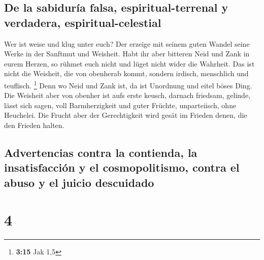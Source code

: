 \hypertarget{de-la-sabiduruxeda-falsa-espiritual-terrenal-y-verdadera-espiritual-celestial}{%
\subsection{De la sabiduría falsa, espiritual-terrenal y verdadera,
espiritual-celestial}\label{de-la-sabiduruxeda-falsa-espiritual-terrenal-y-verdadera-espiritual-celestial}}

 Wer ist weise und klug unter euch? Der erzeige mit
seinem guten Wandel seine Werke in der Sanftmut und Weisheit.
 Habt ihr aber bitteren Neid und Zank in eurem Herzen, so
rühmet euch nicht und lüget nicht wider die Wahrheit. 
Das ist nicht die Weisheit, die von obenherab kommt, sondern irdisch,
menschlich und teuflisch. \footnote{\textbf{3:15} Jak 1,5}
 Denn wo Neid und Zank ist, da ist Unordnung und eitel
böses Ding.  Die Weisheit aber von obenher ist aufs erste
keusch, darnach friedsam, gelinde, lässt sich sagen, voll Barmherzigkeit
und guter Früchte, unparteiisch, ohne Heuchelei.  Die
Frucht aber der Gerechtigkeit wird gesät im Frieden denen, die den
Frieden halten.

\hypertarget{advertencias-contra-la-contienda-la-insatisfacciuxf3n-y-el-cosmopolitismo-contra-el-abuso-y-el-juicio-descuidado}{%
\subsection{Advertencias contra la contienda, la insatisfacción y el
cosmopolitismo, contra el abuso y el juicio
descuidado}\label{advertencias-contra-la-contienda-la-insatisfacciuxf3n-y-el-cosmopolitismo-contra-el-abuso-y-el-juicio-descuidado}}

\hypertarget{section-3}{%
\section{4}\label{section-3}}

